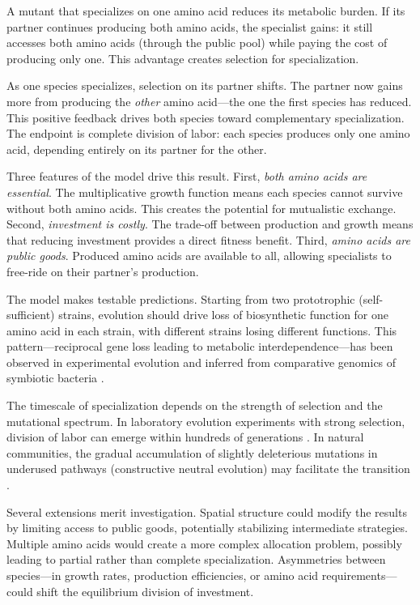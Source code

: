 \documentclass[11pt]{article}
\begin{document}
A mutant that specializes on one amino acid reduces its metabolic burden. If its partner continues producing both amino acids, the specialist gains: it still accesses both amino acids (through the public pool) while paying the cost of producing only one. This advantage creates selection for specialization.

As one species specializes, selection on its partner shifts. The partner now gains more from producing the \textit{other} amino acid---the one the first species has reduced. This positive feedback drives both species toward complementary specialization. The endpoint is complete division of labor: each species produces only one amino acid, depending entirely on its partner for the other.

Three features of the model drive this result. First, \textit{both amino acids are essential}. The multiplicative growth function means each species cannot survive without both amino acids. This creates the potential for mutualistic exchange. Second, \textit{investment is costly}. The trade-off between production and growth means that reducing investment provides a direct fitness benefit. Third, \textit{amino acids are public goods}. Produced amino acids are available to all, allowing specialists to free-ride on their partner's production.

The model makes testable predictions. Starting from two prototrophic (self-sufficient) strains, evolution should drive loss of biosynthetic function for one amino acid in each strain, with different strains losing different functions. This pattern---reciprocal gene loss leading to metabolic interdependence---has been observed in experimental evolution \citep{harcombe2018evolution} and inferred from comparative genomics of symbiotic bacteria \citep{moran2007genomic}.

The timescale of specialization depends on the strength of selection and the mutational spectrum. In laboratory evolution experiments with strong selection, division of labor can emerge within hundreds of generations \citep{pande2014fitness}. In natural communities, the gradual accumulation of slightly deleterious mutations in underused pathways (constructive neutral evolution) may facilitate the transition \citep{morris2012get}.

Several extensions merit investigation. Spatial structure could modify the results by limiting access to public goods, potentially stabilizing intermediate strategies. Multiple amino acids would create a more complex allocation problem, possibly leading to partial rather than complete specialization. Asymmetries between species---in growth rates, production efficiencies, or amino acid requirements---could shift the equilibrium division of investment.
\end{document}
